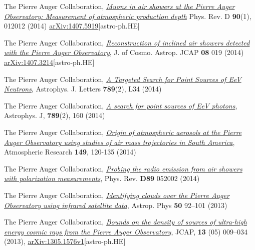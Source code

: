 \begin{etaremune}
\item {}The Pierre Auger Collaboration, \href{http://journals.aps.org/prd/abstract/10.1103/PhysRevD.90.012012}{\emph{Muons in air showers at the Pierre Auger Observatory: Measurement of atmospheric production depth}} Phys. Rev. D {\bf{90}}(1), 012012 (2014) \href{http://arxiv.org/abs/1407.5919}{arXiv:1407.5919}[astro-ph.HE]

\item {}The Pierre Auger Collaboration, \href{http://dx.doi.org/10.1088/1475-7516/2014/08/019}{\emph{Reconstruction of inclined air showers detected with the Pierre Auger Observatory}}, J. of Cosmo. Astrop. JCAP {\bf{08}} 019 (2014) \href{http://arxiv.org/abs/1407.3214}{arXiv:1407.3214}[astro-ph.HE]
  
\item {}The Pierre Auger Collaboration, \href{http://iopscience.iop.org/2041-8205/789/2/L34}{\emph{A Targeted Search for Point Sources of EeV Neutrons}}, Astrophys. J. Letters {\bf{789}}(2), L34 (2014)

\item {}The Pierre Auger Collaboration, \href{http://iopscience.iop.org/0004-637X/789/2/160}{\emph{A search for point sources of EeV photons}}, Astrophys. J, {\bf{789}}(2), 160 (2014)

\item {}The Pierre Auger Collaboration, \href{http://dx.doi.org/10.1016/j.atmosres.2014.05.021}{\emph{Origin of atmospheric aerosols at the Pierre Auger Observatory using studies of air mass trajectories in South America}}, Atmospheric Research {\bf{149}}, 120-135 (2014)

\item {}The Pierre Auger Collaboration, \href{http://dx.doi.org/10.1103/PhysRevD.89.052002}{\emph{Probing the radio emission from air showers with polarization measurements}}, Phys. Rev. {\bf{D89}} 052002 (2014)

\item {}The Pierre Auger Collaboration, \href{http://dx.doi.org/10.1016/j.astropartphys.2013.09.004}{\emph{Identifying clouds over the Pierre Auger Observatory using infrared satellite data}}, Astrop. Phys {\bf{50}} 92--101 (2013)

\item {}The Pierre Auger Collaboration, \href{http://dx.doi.org/10.1088/1475-7516/2013/05/009}{\emph{Bounds on the density of sources of ultra-high energy cosmic rays from the Pierre Auger Observatory}}, JCAP, {\bf{13}} (05) 009--034 (2013), \href{http://arxiv.org/abs/1305.1576}{arXiv:1305.1576v1}[astro-ph.HE]


\end{etaremune}
